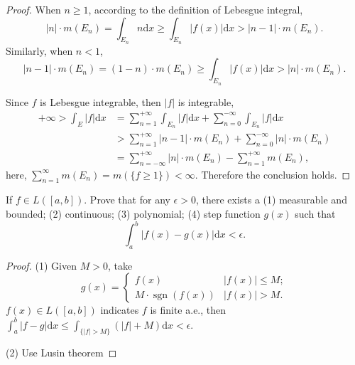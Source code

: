 \begin{proof}
  When $n \geq 1$, according to the definition of Lebesgue integral,
  \begin{equation}
    |n| \cdot m(E_n) = \int_{E_n} n \mathrm{d} x \geq \int_{E_n} |f(x)| \mathrm{d}x
    > |n-1| \cdot m(E_n).
  \end{equation}
  Similarly, when $n < 1$,
  \begin{equation}
    |n - 1| \cdot m(E_n) = (1-n) \cdot m(E_n) \geq \int_{E_n} |f(x)|\mathrm{d}x
    > |n|\cdot m(E_n).
  \end{equation}

  Since $f$ is Lebesgue integrable, then $|f|$ is integrable,
  \begin{align}
    +\infty > \int_E |f|\mathrm{d} x
    &= \sum\limits_{n = 1}^{+\infty} \int_{E_n} |f|\mathrm{d}x + \sum\limits_{n = 0}^{-\infty} \int_{E_n}|f|\mathrm{d}x\\
    &> \sum\limits_{n = 1}^{+\infty} |n-1| \cdot m(E_n)
    + \sum\limits_{n = 0}^{-\infty} |n| \cdot m(E_n)\\
    &= \sum\limits_{n = -\infty}^{+\infty} |n| \cdot m(E_n) - \sum\limits_{n = 1}^{+\infty} m(E_n),
  \end{align}
  here, $\sum\limits_{n = 1}^{\infty} m(E_n) = m(\{f \geq 1\}) < \infty$.
  Therefore the conclusion holds.
\end{proof}

\begin{exercise}{}{}
  If $f \in L([a, b])$. Prove that for any $\epsilon > 0$, there exists a
  (1) measurable and bounded;
  (2) continuous;
  (3) polynomial;
  (4) step function
  $g(x)$ such that
  \begin{equation}
    \int_a^b |f(x) - g(x)| \mathrm{d} x < \epsilon.
  \end{equation}
\end{exercise}

\begin{proof}
  (1) Given $M > 0$, take
  \begin{equation}
    g(x) =
    \begin{cases}
      f(x) & |f(x)| \leq M; \\
      M\cdot \operatorname{sgn}(f(x)) & |f(x)| > M.
    \end{cases}
  \end{equation}
  $f(x) \in L([a,b])$ indicates $f$ is finite a.e.,
  then $\int_a^b |f-g|\mathrm{d} x \leq \int_{\{|f| > M\}} (|f| + M) \mathrm{d} x < \epsilon$.

  (2) Use Lusin theorem
\end{proof}

